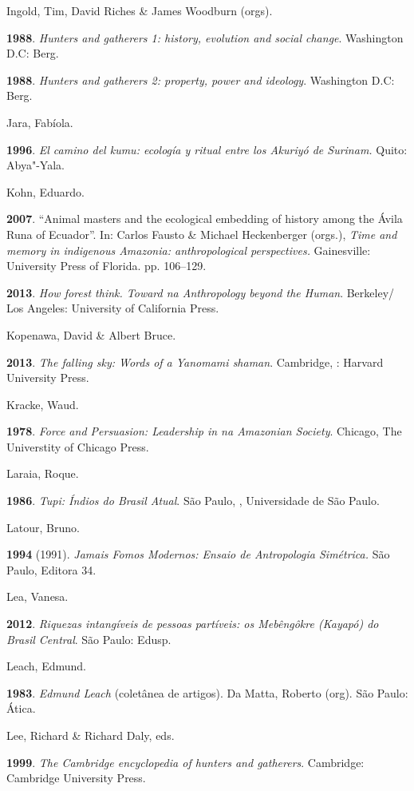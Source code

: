 \begin{Parskip}
Ingold, Tim, David Riches \& James Woodburn (orgs).

\textbf{1988}. \emph{Hunters and gatherers 1: history, evolution and
social change}. Washington D.C: Berg.

\textbf{1988}. \emph{Hunters and gatherers 2: property, power and
ideology}. Washington D.C: Berg.

Jara, Fabíola.

\textbf{1996}. \emph{El camino del kumu: ecología y ritual entre los
Akuriyó de Surinam.} Quito: Abya"-Yala.

Kohn, Eduardo.

\textbf{2007}. ``Animal masters and the ecological embedding of history
among the Ávila Runa of Ecuador''. In: Carlos Fausto \& Michael
Heckenberger (orgs.), \emph{Time and memory in indigenous Amazonia:
anthropological perspectives.} Gainesville: University Press of Florida.
pp. 106--129.

\textbf{2013}. \emph{How forest think. Toward na Anthropology beyond the
Human}. Berkeley/ Los Angeles: University of California Press.

Kopenawa, David \& Albert Bruce.

\textbf{2013}. \emph{The falling sky: Words of a Yanomami shaman}.
Cambridge, : Harvard University Press.

Kracke, Waud.

\textbf{1978}. \emph{Force and Persuasion: Leadership in na Amazonian
Society}. Chicago, The Universtity of Chicago Press.

Laraia, Roque.

\textbf{1986}. \emph{Tupi: Índios do Brasil Atual}. São Paulo, ,
Universidade de São Paulo.

Latour, Bruno.

\textbf{1994} (1991). \emph{Jamais Fomos Modernos: Ensaio de
Antropologia Simétrica.} São Paulo, Editora 34.

Lea, Vanesa.

\textbf{2012}. \emph{Riquezas intangíveis de pessoas partíveis: os
Mebêngôkre (Kayapó) do Brasil Central}. São Paulo: Edusp.

Leach, Edmund.

\textbf{1983}. \emph{Edmund Leach} (coletânea de artigos). Da Matta,
Roberto (org). São Paulo: Ática.

Lee, Richard \& Richard Daly, eds.

\textbf{1999}. \emph{The Cambridge encyclopedia of hunters and
gatherers}. Cambridge: Cambridge University Press.


\end{Parskip}
